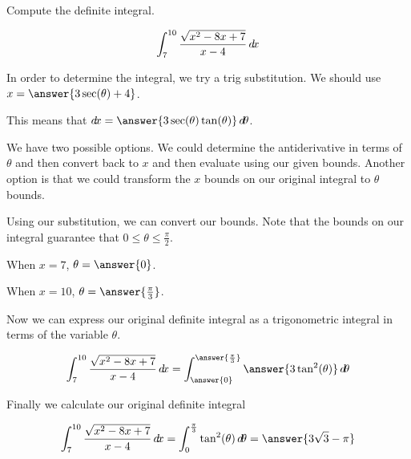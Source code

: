 \documentclass{ximera}
\author{Jason Miller}
\begin{document}
\begin{exercise}
Compute the definite integral. 

\[
\int_{7}^{10} \frac{\sqrt{x^{2}-8x+7}}{x-4} \mathop{}\!d\! x
\]



In order to determine the integral, we try a trig substitution.
We should use $x=\answer{3\sec(\theta)+4}$. 

This means that $\d x= \answer{ 3\sec(\theta)\tan(\theta)} \d \theta$. 


\begin{exercise}
We have two possible options. We could determine the antiderivative in terms of $\theta$ 
and then convert back to $x$ and then evaluate using our given bounds. 
Another option is that we could transform the $x$ bounds on our original integral to $\theta$ bounds. 

Using our substitution, we can convert our bounds. Note that the bounds on our integral guarantee that $0\leq \theta \leq \frac{\pi}{2}$. 

When $x=7$, $\theta=\answer{0}$. 

When $x=10$, $\theta=\answer{\frac{\pi}{3}}$. 



\begin{exercise}


Now we can express our original definite integral as a trigonometric integral in terms of the variable $\theta$. 

\[
\int_{7}^{10} \frac{\sqrt{x^{2}-8x+7}}{x-4}  \d x= \int_{\answer{0}}^{\answer{\frac{\pi}{3}}}  \answer{3\tan^{2}(\theta)}   \d \theta
\]

\begin{exercise}
Finally we calculate our original definite integral 

\[
\int_{7}^{10} \frac{\sqrt{x^{2}-8x+7}}{x-4} \d x=\int_{0}^{\frac{\pi}{3}} \tan^{2}(\theta) \d \theta=\answer{3\sqrt{3}-\pi}
\]



\end{exercise}
\end{exercise}

\end{exercise}

\end{exercise}
\end{document}
